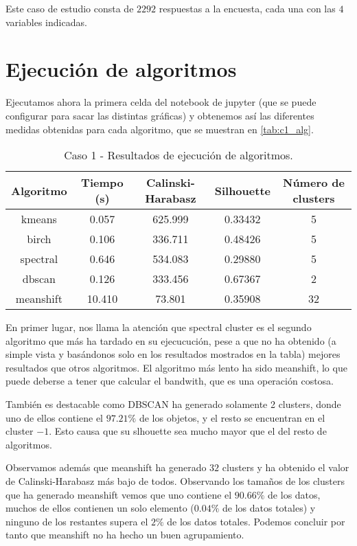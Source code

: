 Este caso de estudio consta de $2292$ respuestas a la encuesta, cada una con las $4$ variables indicadas.

\section{Ejecución de algoritmos}

Ejecutamos ahora la primera celda del notebook de jupyter (que se puede configurar para sacar las distintas gráficas) y obtenemos así las diferentes medidas obtenidas para cada algoritmo, que se muestran en \eqref{tab:c1_alg}.

\begin{table}[H]
\centering
\caption{Caso 1 - Resultados de ejecución de algoritmos.}
\label{tab:c1_alg}
\begin{tabular}{ccccc}
\toprule
 Algoritmo & Tiempo (s) & Calinski-Harabasz & Silhouette & Número de clusters \\
\midrule
kmeans & 0.057 & 625.999 & 0.33432 & 5 \\
birch & 0.106 & 336.711 & 0.48426 & 5 \\
spectral & 0.646 & 534.083 & 0.29880 & 5 \\
dbscan & 0.126 & 333.456 & 0.67367 & 2 \\
meanshift & 10.410 & 73.801 & 0.35908 & 32 \\
\bottomrule
\end{tabular}
\end{table}

En primer lugar, nos llama la atención que spectral cluster es el segundo algoritmo que más ha tardado en su ejecucución, pese a que no ha obtenido (a simple vista y basándonos solo en los resultados mostrados en la tabla) mejores resultados que otros algoritmos. El algoritmo más lento ha sido meanshift, lo que puede deberse a tener que calcular el bandwith, que es una operación costosa.

También es destacable como DBSCAN ha generado solamente 2 clusters, donde uno de ellos contiene el $97.21\%$ de los objetos, y el resto se encuentran en el cluster $-1$. Esto causa que su slhouette sea mucho mayor que el del resto de algoritmos.

Observamos además que meanshift ha generado $32$ clusters y ha obtenido el valor de Calinski-Harabasz más bajo de todos. Observando los tamaños de los clusters que ha generado meanshift vemos que uno contiene el $90.66\%$ de los datos, muchos de ellos contienen un solo elemento ($0.04\%$ de los datos totales) y ninguno de los restantes supera el $2\%$ de los datos totales. Podemos concluir por tanto que meanshift no ha hecho un buen agrupamiento.

